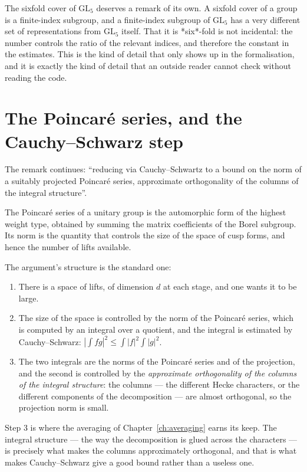 The sixfold cover of $\mathrm{GL}_5$ deserves a remark of its own. A
sixfold cover of a group is a finite-index subgroup, and a finite-index
subgroup of $\mathrm{GL}_5$ has a very different set of representations from
$\mathrm{GL}_5$ itself. That it is *six*-fold is not incidental: the number
controls the ratio of the relevant indices, and therefore the constant in the
estimates. This is the kind of detail that only shows up in the formalisation,
and it is exactly the kind of detail that an outside reader cannot check
without reading the code.

\section{The Poincar\'e series, and the Cauchy--Schwarz step}The remark continues: ``reducing via Cauchy--Schwartz to a bound on the norm of
a suitably projected Poincar\'e series, approximate orthogonality of the columns
of the integral structure''.

The Poincar\'e series of a unitary group is the automorphic form of the
highest weight type, obtained by summing the matrix coefficients of the
Borel subgroup. Its norm is the quantity that controls the size of the space
of cusp forms, and hence the number of lifts available.

The argument's structure is the standard one:

\begin{enumerate}
\item There is a space of lifts, of dimension $d$ at each stage, and one wants
it to be large.
\item The size of the space is controlled by the norm of the Poincar\'e series,
which is computed by an integral over a quotient, and the integral is
estimated by Cauchy--Schwarz: $\left|\int f g\right|^2 \le \int|f|^2 \int|g|^2$.
\item The two integrals are the norms of the Poincar\'e series and of the
projection, and the second is controlled by the \emph{approximate orthogonality
of the columns of the integral structure}: the columns --- the different
Hecke characters, or the different components of the decomposition --- are
almost orthogonal, so the projection norm is small.
\end{enumerate}

Step 3 is where the averaging of Chapter~\ref{ch:averaging} earns its keep.
The integral structure --- the way the decomposition is glued across the
characters --- is precisely what makes the columns approximately orthogonal,
and that is what makes Cauchy--Schwarz give a good bound rather than a useless
one.

